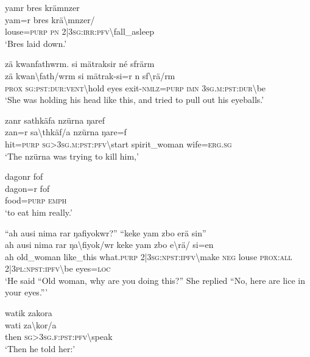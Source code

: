 \newpage
\ea\label{ex:8:a1722}
yamr bres krämnzer\\
\gll yam=r	bres	krä{\textbackslash}mnzer/\\
     louse=\textsc{purp}	\textsc{pn}	2|3\textsc{sg}:\textsc{irr}:\textsc{pfv}{\textbackslash}fall\_asleep\\
\glt `Bres laid down.'
\z

\ea\label{ex:8:a1723}
zä kwanfathwrm. si mätraksir né sfrärm\\
\gll zä	kwan{\textbackslash}fath/wrm	si	mätrak-si=r	n	sf{\textbackslash}rä/rm\\
     \textsc{prox}	\textsc{sg}:\textsc{pst}:\textsc{dur}:\textsc{vent}{\textbackslash}hold	eyes	exit-\textsc{nmlz}=\textsc{purp}	\textsc{imn}	3\textsc{sg}.\textsc{m}:\textsc{pst}:\textsc{dur}{\textbackslash}be\\
\glt `She was holding his head like this, and tried to pull out his eyeballs.'
\z

\ea\label{ex:8:a1724}
zanr sathkäfa nzürna ŋaref\\
\gll zan=r	sa{\textbackslash}thkäf/a	nzürna	ŋare=f\\
     hit=\textsc{purp}	\textsc{sg}>3\textsc{sg}.\textsc{m}:\textsc{pst}:\textsc{pfv}{\textbackslash}start	spirit\_woman	wife=\textsc{erg}.\textsc{sg}\\
\glt `The nzürna was trying to kill him,'
\z

\ea\label{ex:8:a1725}
dagonr fof\\
\gll dagon=r	fof\\
     food=\textsc{purp}	\textsc{emph}\\
\glt `to eat him really.'
\z

\ea\label{ex:8:a1726}
``ah ausi nima rar ŋafiyokwr?'' ``keke yam zbo erä sin''\\
\gll ah	ausi	nima	rar	ŋa{\textbackslash}fiyok/wr	keke	yam	zbo	e{\textbackslash}rä/	si=en\\
     ah	old\_woman	like\_this	what.\textsc{purp}	2|3\textsc{sg}:\textsc{npst}:\textsc{ipfv}{\textbackslash}make	\textsc{neg}	louse	\textsc{prox}:\textsc{all}	2|3\textsc{pl}:\textsc{npst}:\textsc{ipfv}{\textbackslash}be	eyes=\textsc{loc}\\
\glt `He said ``Old woman, why are you doing this?'' She replied ``No, here are lice in your eyes.'''
\z

\ea\label{ex:8:a1727}
watik zakora\\
\gll wati	za{\textbackslash}kor/a\\
     then	\textsc{sg}>3\textsc{sg}.\textsc{f}:\textsc{pst}:\textsc{pfv}{\textbackslash}speak\\
\glt `Then he told her:'
\z


